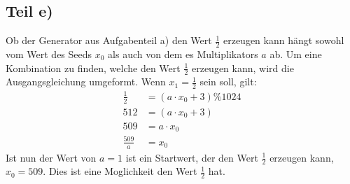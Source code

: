 \subsection{Teil e)}
Ob der Generator aus Aufgabenteil a) den Wert $\frac{1}{2}$ erzeugen kann hängt sowohl
vom Wert des Seeds $x_0$ als auch von dem es Multiplikators $a$ ab. Um eine Kombination
zu finden, welche den Wert $\frac{1}{2}$ erzeugen kann, wird die Ausgangsgleichung
umgeformt. Wenn $x_1 = \frac{1}{2}$ sein soll, gilt:
\begin{align*}
  \frac{1}{2} &= (a\cdot x_0 +3)\%1024\\
  512 &= (a\cdot x_0 +3)\\
  509 &= a\cdot x_0 \\
  \frac{509}{a} &=x_0
\end{align*}
Ist nun der Wert von $a=1$ ist ein Startwert, der den Wert $\frac{1}{2}$
erzeugen kann, $x_0=509$. Dies ist eine Moglichkeit den Wert $\frac{1}{2}$ hat.
